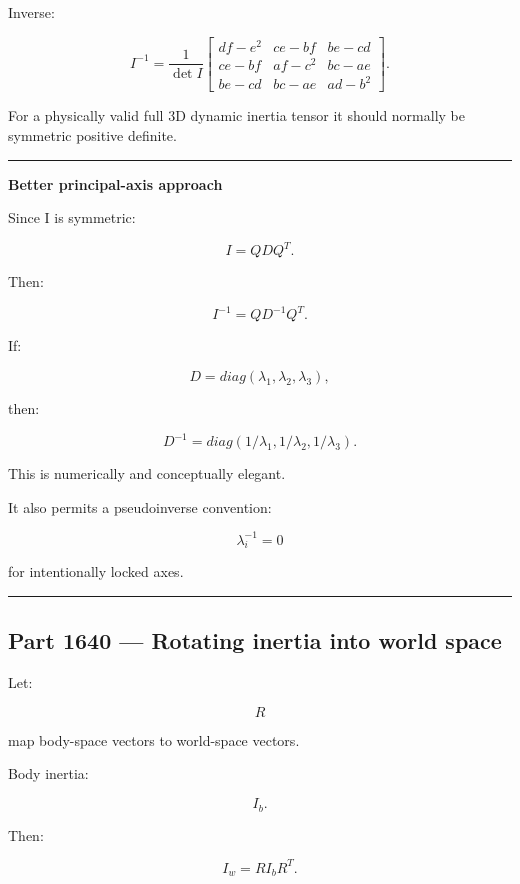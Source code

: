 Inverse:

\[
I^{-1}
=
\frac1{\det I}
\begin{bmatrix}
df-e^2 & ce-bf & be-cd\\
ce-bf & af-c^2 & bc-ae\\
be-cd & bc-ae & ad-b^2
\end{bmatrix}.
\]

For a physically valid full 3D dynamic inertia tensor it should normally be symmetric positive definite.

\begin{center}\rule{0.5\linewidth}{0.5pt}\end{center}

\textbf{Better principal-axis approach}

Since I is symmetric:

\[
I=QDQ^T.
\]

Then:

\[
I^{-1}
=
QD^{-1}Q^T.
\]

If:

\[
D=
diag(\lambda_1,\lambda_2,\lambda_3),
\]

then:

\[
D^{-1}
=
diag(
1/\lambda_1,
1/\lambda_2,
1/\lambda_3
).
\]

This is numerically and conceptually elegant.

It also permits a pseudoinverse convention:

\[
\lambda_i^{-1}=0
\]

for intentionally locked axes.

\begin{center}\rule{0.5\linewidth}{0.5pt}\end{center}

\subsection{Part 1640 --- Rotating inertia into world space}\label{06-engine-ii-ch035-part-1640-rotating-inertia-into-world-space}

\hypertarget{06-engine-ii-ch035-part-1640-rotating-inertia-into-world-space}{}

Let:

\[
R
\]

map body-space vectors to world-space vectors.

Body inertia:

\[
I_b.
\]

Then:

\[
\boxed{
I_w
=
RI_bR^T.
}
\]

